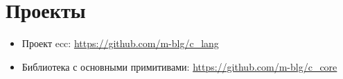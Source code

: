 \newcommand{\nocontentsline}[3]{}
\newcommand{\tocless}[2]{\bgroup\let\addcontentsline=\nocontentsline#1{#2}\egroup}

\tocless\chapter{Проекты}



\begin{itemize}
\item\label{extras:ecc} Проект ecc: \url{https://github.com/m-blg/c_lang}

\item\label{extras:c-core} Библиотека с основными примитивами: \url{https://github.com/m-blg/c_core}
\end{itemize}










\pagestyle{appendixpage}


